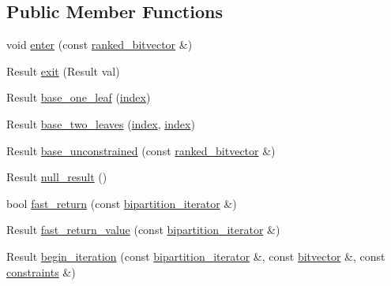 \subsection*{Public Member Functions}
\begin{DoxyCompactItemize}
\item 
void \hyperlink{classterraces_1_1variants_1_1abstract__callback_adf435bcc662fcf318ce9346a96a6a38f}{enter} (const \hyperlink{namespaceterraces_acc45ec9c561024c50ecbce5b6738ba08}{ranked\+\_\+bitvector} \&)
\item 
Result \hyperlink{classterraces_1_1variants_1_1abstract__callback_a47cd86299e98295ebb4c083a1a4216f3}{exit} (Result val)
\item 
Result \hyperlink{classterraces_1_1variants_1_1abstract__callback_a0f548b968a4027953c57378d33938026}{base\+\_\+one\+\_\+leaf} (\hyperlink{namespaceterraces_adbc33ccb543d1634e96d0eb02e472c77}{index})
\item 
Result \hyperlink{classterraces_1_1variants_1_1abstract__callback_ab252330b1c41618075dee4dbc4a6284a}{base\+\_\+two\+\_\+leaves} (\hyperlink{namespaceterraces_adbc33ccb543d1634e96d0eb02e472c77}{index}, \hyperlink{namespaceterraces_adbc33ccb543d1634e96d0eb02e472c77}{index})
\item 
Result \hyperlink{classterraces_1_1variants_1_1abstract__callback_ab067313cb90b076ac0e96bb4a10637bd}{base\+\_\+unconstrained} (const \hyperlink{namespaceterraces_acc45ec9c561024c50ecbce5b6738ba08}{ranked\+\_\+bitvector} \&)
\item 
Result \hyperlink{classterraces_1_1variants_1_1abstract__callback_af17192793805d3568b4de20aa857f02d}{null\+\_\+result} ()
\item 
bool \hyperlink{classterraces_1_1variants_1_1abstract__callback_a3f311a32d48f72f0766dcfe58573af26}{fast\+\_\+return} (const \hyperlink{classterraces_1_1bipartition__iterator}{bipartition\+\_\+iterator} \&)
\item 
Result \hyperlink{classterraces_1_1variants_1_1abstract__callback_a2efb18adddf3a5fa1f3934f5a9385997}{fast\+\_\+return\+\_\+value} (const \hyperlink{classterraces_1_1bipartition__iterator}{bipartition\+\_\+iterator} \&)
\item 
Result \hyperlink{classterraces_1_1variants_1_1abstract__callback_a1a774cf9c621fa1559d0a29980ca27df}{begin\+\_\+iteration} (const \hyperlink{classterraces_1_1bipartition__iterator}{bipartition\+\_\+iterator} \&, const \hyperlink{namespaceterraces_a1b526fb554dff829f7ad51eb21d5ed06}{bitvector} \&, const \hyperlink{namespaceterraces_a6f603ffd30ed4d902fce6424492e0581}{constraints} \&)

\end{DoxyCompactItemize}
